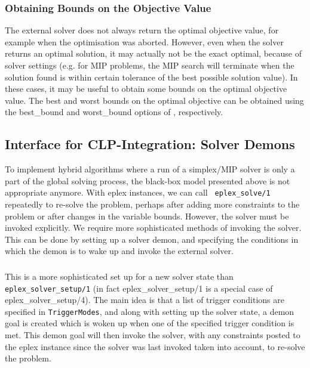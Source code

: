 \subsubsection{Obtaining Bounds on the Objective Value}

The external solver does not always return the optimal objective
value, for example when the optimisation was aborted. However, even when
the solver returns an optimal solution, it may actually not be the exact
optimal, because of solver settings (e.g. for MIP problems, the MIP search
will terminate when the solution found is within certain tolerance of the
best possible solution value). In these cases, it may be useful to obtain
some bounds on the optimal objective value. The best and worst bounds on
the optimal objective can be obtained using the best_bound and worst_bound
options of ,
respectively. 

\subsection{Interface for CLP-Integration: Solver Demons}

To implement hybrid algorithms where a run of a simplex/MIP solver is only
a part of the global solving process, the black-box model presented above
is not appropriate anymore. With eplex instances, we can call {\tt
eplex_solve/1} repeatedly to re-solve the problem, perhaps after adding
more constraints to the problem or after changes in the variable
bounds. However, the solver must be invoked explicitly. We require more
sophisticated methods of invoking the solver. This can be done by setting
up a solver demon, and specifying the conditions in which the demon is to
wake up and invoke the external solver.

\subsubsection{}
This is a more sophisticated set up for a new solver state than
{\tt eplex_solver_setup/1} (in fact eplex_solver_setup/1 is a special case
of eplex_solver_setup/4).
The main idea is that a list of trigger conditions
are specified in {\tt TriggerModes}, and along with setting up the solver
state, a demon goal is created which is woken up when one of the
specified trigger condition is met. This demon goal will then invoke the
solver, with any 
constraints posted to the eplex instance since the solver was last invoked
taken into account, to re-solve the problem. 

